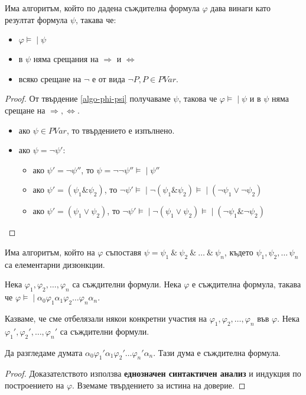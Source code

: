 \documentclass{article}
\newcommand{\mymod}{\models\!\mid}
\def\Proofs{1}
\begin{document}
\begin{claim}
Има алгоритъм, който по дадена съждителна формула $\varphi$ дава винаги като резултат формула $\psi$, такава че:
\begin{itemize}
\item $\varphi \mymod \psi$
\item в $\psi$ няма срещания на $\Rightarrow$ и $\Leftrightarrow$
\item всяко срещане на $\neg$ е от вида $\neg P, P \in PVar$.
\end{itemize}


\ifcase\Proofs\or
\begin{proof}
От твърдение \ref{algo-phi-psi} получаваме $\psi$, такова че $\varphi \mymod \psi$ и в $\psi$ няма срещане на $\Rightarrow, \Leftrightarrow$.

\begin{itemize}
\item ако $\psi \in PVar$, то твърдението е изпълнено.
\item ако $\psi = \neg\psi'$:
\begin{itemize}
\item ако $\psi' = \neg\psi''$, то $\psi = \neg\neg\psi'' \mymod \psi''$
\item ако $\psi' = (\psi_1 \& \psi_2)$, то $\neg\psi' \mymod \neg(\psi_1 \& \psi_2) \mymod (\neg\psi_1 \lor \neg\psi_2)$
\item ако $\psi' = (\psi_1 \lor \psi_2)$, то $\neg\psi' \mymod \neg(\psi_1 \lor \psi_2) \mymod (\neg\psi_1 \& \neg\psi_2)$
\end{itemize}
\end{itemize}
\end{proof}
\fi
\end{claim}

\begin{claim}
Има алгоритъм, който на $\varphi$ съпоставя $\psi = \psi_1\ \&\ \psi_2\ \&\ \ldots\ \&\ \psi_n$, където $\psi_1, \psi_2, \ldots\, \psi_n$ са елементарни дизюнкции.
\end{claim}

\begin{claim}
Нека $\varphi_1, \varphi_2, \ldots, \varphi_n$ са съждителни формули. Нека $\varphi$ е съждителна формула, такава че $\varphi \mymod \alpha_0\varphi_1\alpha_1\varphi_2\ldots\varphi_n\alpha_n$. 

Казваме, че сме отбелязали някои конкретни участия на $\varphi_1, \varphi_2, \ldots, \varphi_n$ във $\varphi$. Нека $\varphi_1', \varphi_2', \ldots, \varphi_n'$ са съждителни формули.

Да разгледаме думата $\alpha_0\varphi_1'\alpha_1\varphi_2'\ldots\varphi_n'\alpha_n$. Тази дума е съждителна формула.

\begin{proof}
Доказателството използва \textbf{еднозначен синтактичен анализ} и индукция по построението на $\varphi$. Вземаме твърдението за истина на доверие.
\end{proof}

\end{claim}
\end{document}

